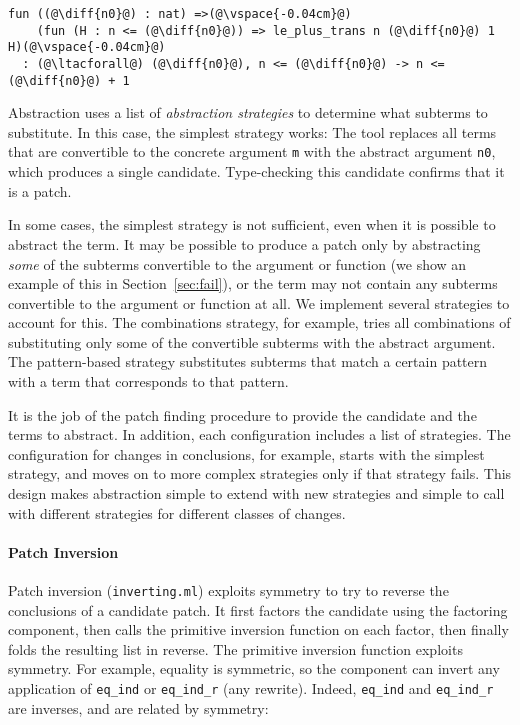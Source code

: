 \begin{lstlisting}[language=coq]
  fun ((@\diff{n0}@) : nat) =>(@\vspace{-0.04cm}@)
    (fun (H : n <= (@\diff{n0}@)) => le_plus_trans n (@\diff{n0}@) 1 H)(@\vspace{-0.04cm}@)
  : (@\ltacforall@) (@\diff{n0}@), n <= (@\diff{n0}@) -> n <= (@\diff{n0}@) + 1
\end{lstlisting}

Abstraction uses a list of \textit{abstraction strategies} to determine what subterms
to substitute. In this case, the simplest strategy works: The tool
replaces all terms that are convertible to the concrete argument \lstinline{m} with the abstract argument
\lstinline{n0}, which produces a single candidate. Type-checking this candidate confirms that it is a patch.

In some cases, the simplest strategy is not sufficient, even when it is possible to abstract the term.
It may be possible to produce a patch only by abstracting \emph{some} of the subterms
convertible to the argument or function (we show an example of this in Section~\ref{sec:fail}),
or the term may not contain any subterms convertible to the argument or function at all.
We implement several strategies to account for this. The combinations strategy, for example,
tries all combinations of substituting only some of the convertible subterms with the abstract argument. 
The pattern-based strategy substitutes subterms that match a certain pattern
with a term that corresponds to that pattern.

It is the job of the patch finding procedure to provide the candidate and the terms to abstract.
In addition, each configuration includes a list of strategies.
The configuration for changes in conclusions, for example, starts with the simplest strategy,
and moves on to more complex strategies only if that strategy fails.
This design makes abstraction simple to extend with new strategies and simple to call with different strategies
for different classes of changes.

\paragraph{Patch Inversion} Patch inversion (\lstinline{inverting.ml}) exploits symmetry to try to reverse the conclusions of a 
candidate patch.
It first factors the candidate using the factoring component, then calls the primitive inversion
function on each factor, then finally folds the resulting list in reverse.
The primitive inversion function exploits symmetry. 
For example, equality is symmetric, so the component can invert any application of \lstinline{eq_ind} or \lstinline{eq_ind_r}
(any rewrite). Indeed, \lstinline{eq_ind} and \lstinline{eq_ind_r} are inverses, and are related by symmetry:

